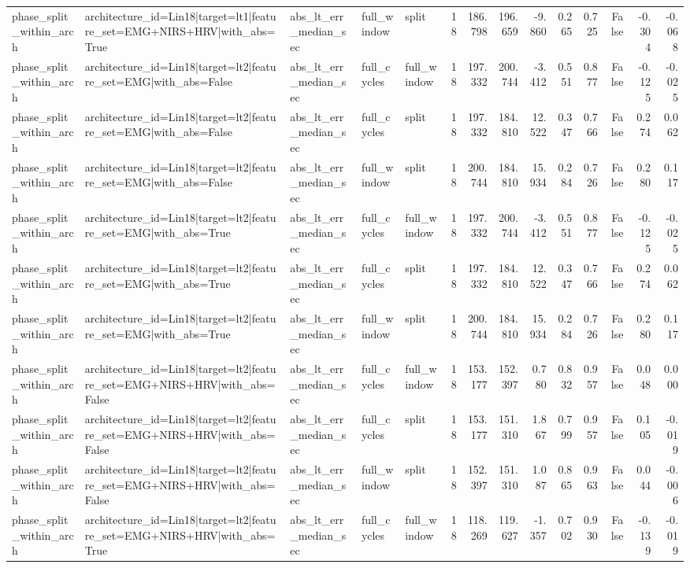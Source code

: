 \begin{table}
\begin{tabular}{lllllrrrrrrrrr}
phase_split_within_arch & architecture_id=Lin18|target=lt1|feature_set=EMG+NIRS+HRV|with_abs=True & abs_lt_err_median_sec & full_window & split & 18 & 186.798 & 196.659 & -9.860 & 0.265 & 0.725 & False & -0.304 & -0.068 \\
phase_split_within_arch & architecture_id=Lin18|target=lt2|feature_set=EMG|with_abs=False & abs_lt_err_median_sec & full_cycles & full_window & 18 & 197.332 & 200.744 & -3.412 & 0.551 & 0.877 & False & -0.125 & -0.025 \\
phase_split_within_arch & architecture_id=Lin18|target=lt2|feature_set=EMG|with_abs=False & abs_lt_err_median_sec & full_cycles & split & 18 & 197.332 & 184.810 & 12.522 & 0.347 & 0.766 & False & 0.274 & 0.062 \\
phase_split_within_arch & architecture_id=Lin18|target=lt2|feature_set=EMG|with_abs=False & abs_lt_err_median_sec & full_window & split & 18 & 200.744 & 184.810 & 15.934 & 0.284 & 0.726 & False & 0.280 & 0.117 \\
phase_split_within_arch & architecture_id=Lin18|target=lt2|feature_set=EMG|with_abs=True & abs_lt_err_median_sec & full_cycles & full_window & 18 & 197.332 & 200.744 & -3.412 & 0.551 & 0.877 & False & -0.125 & -0.025 \\
phase_split_within_arch & architecture_id=Lin18|target=lt2|feature_set=EMG|with_abs=True & abs_lt_err_median_sec & full_cycles & split & 18 & 197.332 & 184.810 & 12.522 & 0.347 & 0.766 & False & 0.274 & 0.062 \\
phase_split_within_arch & architecture_id=Lin18|target=lt2|feature_set=EMG|with_abs=True & abs_lt_err_median_sec & full_window & split & 18 & 200.744 & 184.810 & 15.934 & 0.284 & 0.726 & False & 0.280 & 0.117 \\
phase_split_within_arch & architecture_id=Lin18|target=lt2|feature_set=EMG+NIRS+HRV|with_abs=False & abs_lt_err_median_sec & full_cycles & full_window & 18 & 153.177 & 152.397 & 0.780 & 0.832 & 0.957 & False & 0.048 & 0.000 \\
phase_split_within_arch & architecture_id=Lin18|target=lt2|feature_set=EMG+NIRS+HRV|with_abs=False & abs_lt_err_median_sec & full_cycles & split & 18 & 153.177 & 151.310 & 1.867 & 0.799 & 0.957 & False & 0.105 & -0.019 \\
phase_split_within_arch & architecture_id=Lin18|target=lt2|feature_set=EMG+NIRS+HRV|with_abs=False & abs_lt_err_median_sec & full_window & split & 18 & 152.397 & 151.310 & 1.087 & 0.865 & 0.963 & False & 0.044 & -0.006 \\
phase_split_within_arch & architecture_id=Lin18|target=lt2|feature_set=EMG+NIRS+HRV|with_abs=True & abs_lt_err_median_sec & full_cycles & full_window & 18 & 118.269 & 119.627 & -1.357 & 0.702 & 0.930 & False & -0.139 & -0.019 \\

\end{tabular}
\end{table}
